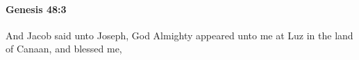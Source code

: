 
		\paragraph{Genesis 48:3} %
			\label{GENESIS-48-3}

			And Jacob said unto Joseph, God Almighty appeared unto me at Luz in the land of Canaan, and blessed me,



